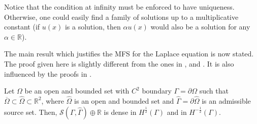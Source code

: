 \begin{remark}
    Notice that the condition at infinity must be enforced to have uniqueness. Otherwise, one could easily find a family of solutions up to a multiplicative constant (if \(u(x)\) is a solution, then \(\alpha u(x)\) would also be a solution for any \(\alpha \in \mathbb{R}\)).
\end{remark}
The main result which justifies the \ac{MFS} for the Laplace equation is now stated. The proof given here is slightly different from the ones in \cite{bogomolny1985fundamental}, \cite{alves2009choice} and \cite{smyrlis2009applicability}. It is also influenced by the proofs in \cite{svilen_phd}.

\begin{theorem}\label{MFS_lap_dense}
    Let \(\Omega\) be an open and bounded set with \(C^2\) boundary \(\Gamma = \partial \Omega\) such that \(\overline{\Omega} \subset \hat{\Omega} \subset \mathbb{R}^2\), where \(\hat{\Omega}\) is an open and bounded set and \(\hat{\Gamma} = \partial \hat{\Omega}\) is an admissible source set. Then, \(\mathcal{S}(\Gamma, \hat{\Gamma}) \oplus \mathbb{R}\) is dense in \(H^\frac{1}{2}(\Gamma)\) and in \(H^{-\frac{1}{2}}(\Gamma)\).
\end{theorem}

